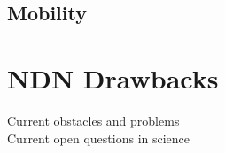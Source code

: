 \subsection{Mobility}


\section{NDN Drawbacks}
Current obstacles and problems \\
Current open questions in science \\

